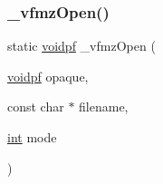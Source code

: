 \subsubsection{\texorpdfstring{\+\_\+vfmz\+Open()}{\_vfmzOpen()}}
{\footnotesize\ttfamily static \mbox{\hyperlink{ioapi_8h_a39ab6d73c1cd44bc17064c2dcbb3e753}{voidpf}} \+\_\+vfmz\+Open (\begin{DoxyParamCaption}\item[{\mbox{\hyperlink{ioapi_8h_a39ab6d73c1cd44bc17064c2dcbb3e753}{voidpf}}}]{opaque,  }\item[{const char $\ast$}]{filename,  }\item[{\mbox{\hyperlink{ioapi_8h_a787fa3cf048117ba7123753c1e74fcd6}{int}}}]{mode }\end{DoxyParamCaption})\hspace{0.3cm}{\ttfamily [static]}}

